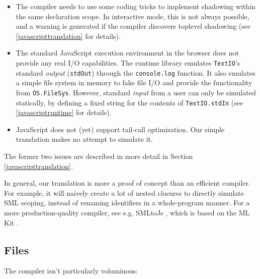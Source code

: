 \documentclass[twoside,titlepage]{article}
\begin{document}
\begin{itemize}
\setlength{\parskip}{0ex}

\item The compiler needs to use some coding tricks to implement shadowing within the same declaration scope. In interactive mode, this is not always possible, and a warning is generated if the compiler discovers toplevel shadowing (see \ref{javascripttranslation} for details).

\item The standard JavaScript execution environment in the browser does not provide any real I/O capabilities. The runtime library emulates {\tt TextIO}'s standard \emph{output} ({\tt stdOut}) through the {\tt console.log} function. It also emulates a simple file system in memory to fake file I/O and provide the functionality from {\tt OS.FileSys}. However, standard {\em input} from a user can only be simulated statically, by defining a fixed string for the contents of {\tt TextIO.stdIn} (see \ref{javascriptruntime} for details).

\item JavaScript does not (yet) support tail-call optimisation. Our simple translation makes no attempt to simulate it.

\end{itemize}

The former two issues are described in more detail in Section \ref{javascripttranslation}.

In general, our translation is more a proof of concept than an efficient compiler. For example, it will naively create a lot of nested closures to directly simulate SML scoping, instead of renaming identifiers in a whole-program manner. For a more production-quality compiler, see e.g. SMLtoJs \cite{smltojs}, which is based on the ML Kit \cite{kit}.


\subsection{Files}
\label{javascriptfiles}

The compiler isn't particularly voluminous:
\end{document}
